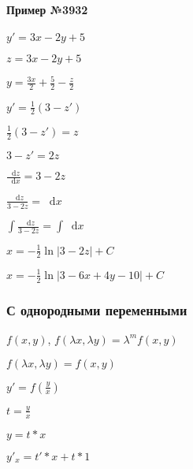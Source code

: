 \documentclass{article}
\newcommand*\diff{\mathop{}\!\mathrm{d}}
\begin{document}
\begin{minipage}{0.49\textwidth}
    \paragraph{Пример №3932} $y' = 3x - 2y + 5$

    $z = 3x - 2y + 5$

    $y = \frac{3x}{2} + \frac{5}{2} - \frac{z}{2}$

    $y' = \frac{1}{2} (3 - z')$

    $\frac{1}{2} (3 - z') = z$

    $3 - z' = 2z$

    $\frac{\diff z}{\diff x} = 3 - 2z$

    $\frac{\diff z}{3 - 2z} = \diff x$

    $\int \frac{\diff z}{3 - 2z} = \int \diff x$

    $x = -\frac{1}{2} \ln |3 - 2z| + C$

    $x = -\frac{1}{2} \ln |3 - 6x + 4y - 10| + C$
\end{minipage}

\subsubsection{С однородными переменными}

$f(x, y)$, $f(\lambda x, \lambda y) = \lambda^{m} f(x, y)$

$f(\lambda x, \lambda y) = f(x, y)$

$y' = f(\frac{y}{x})$

$t = \frac{y}{x}$

$y = t * x$

$y'_x = t' * x + t * 1$
\end{document}
